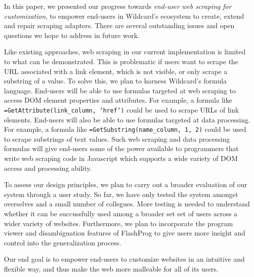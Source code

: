 \documentclass[sigconf,10pt]{acmart}
\begin{document}
In this paper, we presented our progress towards \emph{end-user web
scraping for customization}, to empower end-users in Wildcard's
ecosystem to create, extend and repair scraping adapters. There are
several outstanding issues and open questions we hope to address in
future work.

Like existing approaches, web scraping in our current implementation is
limited to what can be demonstrated. This is problematic if users want
to scrape the URL associated with a link element, which is not visible,
or only scrape a substring of a value. To solve this, we plan to harness
Wildcard's formula language. End-users will be able to use formulas
targeted at web scraping to access DOM element properties and
attributes. For example, a formula like
\texttt{=GetAttribute(link\_column,\ ‘href’)} could be used to scrape
URLs of link elements. End-users will also be able to use formulas
targeted at data processing. For example, a formula like
\texttt{=GetSubstring(name\_column,\ 1,\ 2)} could be used to scrape
substrings of text values. Such web scraping and data processing
formulas will give end-users some of the power available to programmers
that write web scraping code in Javascript which supports a wide variety
of DOM access and processing ability.

To assess our design principles, we plan to carry out a broader
evaluation of our system through a user study. So far, we have only
tested the system amongst overselves and a small number of collegues.
More testing is needed to understand whether it can be succussfully used
among a broader set set of users across a wider variety of websites.
Furthermore, we plan to incorporate the program viewer and
disambiguation features of FlashProg \citep{mayer2015} to give users
more insight and control into the generalization process.

Our end goal is to empower end-users to customize websites in an
intuitive and flexible way, and thus make the web more malleable for all
of its users.




\end{document}
